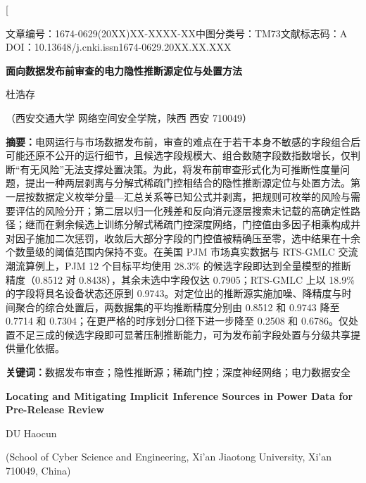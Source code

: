\documentclass[UTF8,zihao=5,twoside]{ctexart}
\newcommand{\articleinfo}{文章编号：1674-0629(20XX)XX-XXXX-XX\quad 中图分类号：TM73\quad 文献标志码：A\\
DOI：10.13648/j.cnki.issn1674-0629.20XX.XX.XXX}
\begin{document}
\twocolumn[

\begin{center}
{\articleinfo}\par\vspace{1.0em}
{\sffamily{}\bfseries 面向数据发布前审查的电力隐性推断源定位与处置方法}\par\vspace{0.8em}
{杜浩存}\par\vspace{0.4em}
{（西安交通大学 网络空间安全学院，陕西 西安 710049）}\par\vspace{0.8em}
\end{center}

\noindent\textbf{摘要：}电网运行与市场数据发布前，审查的难点在于若干本身不敏感的字段组合后可能还原不公开的运行细节，且候选字段规模大、组合数随字段数指数增长，仅判断“有无风险”无法支撑处置决策。为此，将发布前审查形式化为可推断性度量问题，提出一种两层剥离与分解式稀疏门控相结合的隐性推断源定位与处置方法。第一层按数据定义枚举分量—汇总关系等已知公式并剥离，把规则可枚举的风险与需要评估的风险分开；第二层以归一化残差和反向消元逐层搜索未记载的高确定性路径；继而在剩余候选上训练分解式稀疏门控深度网络，门控值由多因子相乘构成并对因子施加二次惩罚，收敛后大部分字段的门控值被精确压至零，选中结果在十余个数量级的阈值范围内保持不变。在美国 PJM 市场真实数据与 RTS-GMLC 交流潮流算例上，PJM 12 个目标平均使用 28.3\% 的候选字段即达到全量模型的推断精度（0.8512 对 0.8438），其余未选中字段仅达 0.7905；RTS-GMLC 上以 18.9\% 的字段将具名设备状态还原到 0.9743。对定位出的推断源实施加噪、降精度与时间聚合的综合处置后，两数据集的平均推断精度分别由 0.8512 和 0.9743 降至 0.7714 和 0.7304；在更严格的时序划分口径下进一步降至 0.2508 和 0.6786。仅处置不足三成的候选字段即可显著压制推断能力，可为发布前字段处置与分级共享提供量化依据。\par
\noindent\textbf{关键词：}数据发布审查；隐性推断源；稀疏门控；深度神经网络；电力数据安全\par\vspace{0.8em}

\begin{center}
{\bfseries\large Locating and Mitigating Implicit Inference Sources in Power Data for Pre-Release Review}\par\vspace{0.5em}
{DU Haocun}\par\vspace{0.3em}
{\small (School of Cyber Science and Engineering, Xi'an Jiaotong University, Xi'an 710049, China)}\par\vspace{0.5em}
\end{center}
\end{document}
